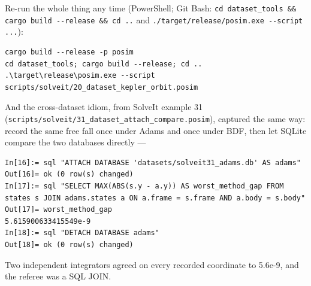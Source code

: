 \documentclass[11pt]{article}
\newcommand{\code}[1]{\texttt{#1}}
\begin{document}
Re-run the whole thing any time (PowerShell; Git Bash:
\code{cd dataset\_tools \&\& cargo build -{}-release \&\& cd ..} and
\code{./target/release/posim.exe -{}-script ...}):

\begin{lstlisting}
cargo build --release -p posim
cd dataset_tools; cargo build --release; cd ..
.\target\release\posim.exe --script scripts/solveit/20_dataset_kepler_orbit.posim
\end{lstlisting}

And the cross-dataset idiom, from SolveIt example 31
(\code{scripts/solveit/31\_dataset\_attach\_compare.posim}), captured
the same way: record the same free fall once under Adams and once
under BDF, then let SQLite compare the two databases directly ---

\begin{lstlisting}
In[16]:= sql "ATTACH DATABASE 'datasets/solveit31_adams.db' AS adams"
Out[16]= ok (0 row(s) changed)
In[17]:= sql "SELECT MAX(ABS(s.y - a.y)) AS worst_method_gap FROM states s JOIN adams.states a ON a.frame = s.frame AND a.body = s.body"
Out[17]= worst_method_gap
5.615900633415549e-9
In[18]:= sql "DETACH DATABASE adams"
Out[18]= ok (0 row(s) changed)
\end{lstlisting}

Two independent integrators agreed on every recorded coordinate to
5.6e-9, and the referee was a SQL JOIN.
\end{document}
